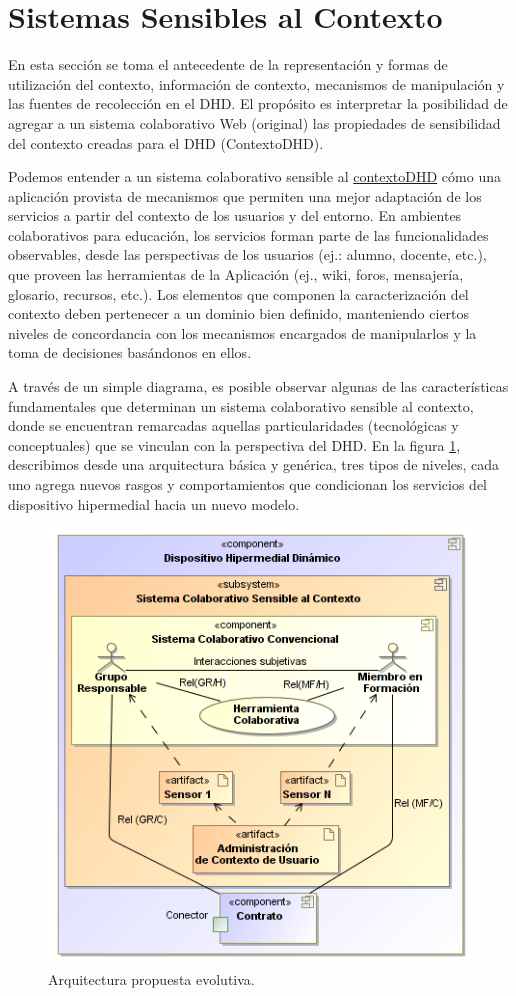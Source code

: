 \section{Sistemas Sensibles al Contexto} \label{sec:cas}


En esta sección se toma el antecedente de la representación y
formas de utilización del contexto, información de contexto, mecanismos de
manipulación y las fuentes de recolección en el DHD. El propósito es
interpretar la posibilidad de agregar a un sistema
colaborativo Web (original) las propiedades de sensibilidad del
contexto creadas para el DHD (ContextoDHD).

Podemos entender a un sistema colaborativo sensible al
\hyperref[contextodhd]{contextoDHD} cómo una
aplicación provista de mecanismos que permiten una mejor adaptación de los
servicios a partir del contexto de los usuarios y del entorno. En ambientes
colaborativos para educación, los servicios forman parte de las funcionalidades
observables, desde las perspectivas de los usuarios (ej.: alumno, docente, etc.),
que proveen las herramientas de la Aplicación (ej., wiki, foros, mensajería,
glosario, recursos, etc.). Los elementos que componen la caracterización del
contexto deben pertenecer a un dominio bien definido, manteniendo ciertos
niveles de concordancia con los mecanismos encargados de manipularlos y la toma
de decisiones basándonos en ellos.

A través de un simple diagrama, es posible observar algunas de las características
fundamentales que determinan un sistema colaborativo sensible al contexto,
donde se
encuentran remarcadas aquellas particularidades (tecnológicas y
conceptuales) que se vinculan con la perspectiva del DHD. En la figura
\ref{fig:evolucion}, describimos desde una arquitectura básica y genérica, tres
tipos de niveles, cada uno agrega nuevos rasgos y comportamientos que
condicionan los servicios del dispositivo hipermedial hacia un nuevo modelo.

\begin{figure}
\begin{center}
 \includegraphics[width=3.5 in,totalheight=3.5in] {Ch1/MEvolutivo.png}
\caption{Arquitectura propuesta evolutiva.}\label{fig:evolucion}
\end{center}
\end{figure}

